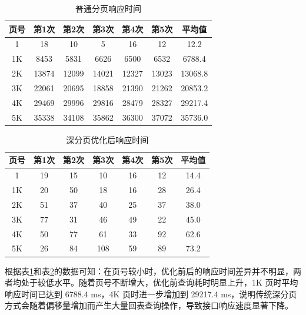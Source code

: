 \begin{table}[H]
	\centering
	\caption{普通分页响应时间}
	\label{tab:deep-pagination-response-before}
	{\songti\seuwuhao\selectfont
		\begin{tabular}{ccccccc}
			\toprule
			页号 & 第1次 & 第2次 & 第3次 & 第4次 & 第5次 & 平均值 \\
			\midrule
			1   & 18    & 10    & 5     & 16    & 12    & 12.2 \\
			1K  & 8453  & 5831  & 6626  & 6500  & 6532  & 6788.4 \\
			2K  & 13874 & 12099 & 14021 & 12327 & 13023 & 13068.8 \\
			3K  & 22061 & 20695 & 18858 & 21390 & 21262 & 20853.2 \\
			4K  & 29469 & 29996 & 29816 & 28479 & 28327 & 29217.4 \\
			5K  & 35338 & 34108 & 35862 & 36300 & 37072 & 35736.0 \\
			\bottomrule
		\end{tabular}
	}
\end{table}

\begin{table}[H]
	\centering
	\caption{深分页优化后响应时间}
	\label{tab:deep-pagination-response-after}
	{\songti\seuwuhao\selectfont
		\begin{tabular}{ccccccc}
			\toprule
			页号 & 第1次 & 第2次 & 第3次 & 第4次 & 第5次 & 平均值 \\
			\midrule
			1   & 19    & 15    & 10    & 16    & 12    & 14.4 \\
			1K  & 20    & 50    & 18    & 16    & 28    & 26.4 \\
			2K  & 51    & 37    & 40    & 25    & 37    & 38.0 \\
			3K  & 77    & 31    & 46    & 49    & 22    & 45.0 \\
			4K  & 50    & 77    & 61    & 33    & 92    & 62.6 \\
			5K  & 26    & 84    & 108   & 59    & 89    & 73.2 \\
			\bottomrule
		\end{tabular}
	}
\end{table}

根据表\ref{tab:deep-pagination-response-before}和表\ref{tab:deep-pagination-response-after}的数据可知：在页号较小时，优化前后的响应时间差异并不明显，两者均处于较低水平。随着页号不断增大，优化前查询耗时明显上升，1K 页时平均响应时间已达到 6788.4 ms，4K 页时进一步增加到 29217.4 ms，说明传统深分页方式会随着偏移量增加而产生大量回表查询操作，导致接口响应速度显著下降。

